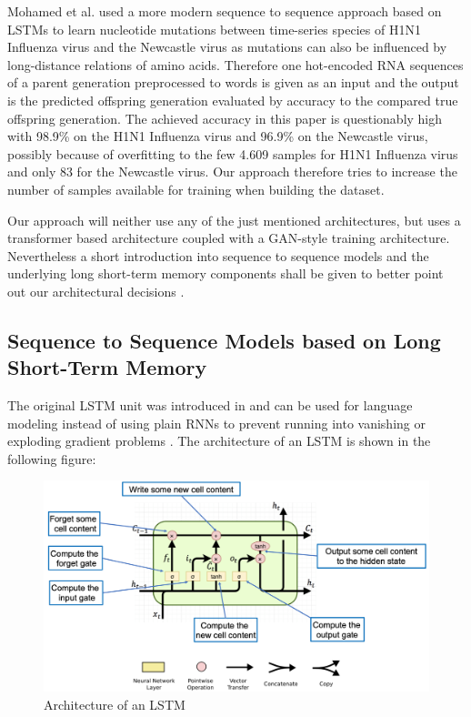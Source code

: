 Mohamed et al. \cite{Mohamed2021} used a more modern sequence to sequence approach based on \acp{LSTM} to learn nucleotide mutations between time-series species of H1N1 Influenza virus and the Newcastle virus as mutations can also be influenced by long-distance relations of amino acids. Therefore one hot-encoded \ac{RNA} sequences of a parent generation preprocessed to words is given as an input and the output is the predicted offspring generation evaluated by accuracy to the compared true offspring generation. The achieved accuracy in this paper is questionably high with 98.9\% on the H1N1 Influenza virus and 96.9\% on the Newcastle virus, possibly because of overfitting to the few 4.609 samples for H1N1 Influenza virus and only 83 for the Newcastle virus. Our approach therefore tries to increase the number of samples available for training when building the dataset. 

Our approach will neither use any of the just mentioned architectures, but uses a transformer based architecture coupled with a GAN-style training architecture. Nevertheless a short introduction into sequence to sequence models and the underlying long short-term memory components shall be given to better point out our architectural decisions . 

\subsection{Sequence to Sequence Models based on Long Short-Term Memory} \label{fundamentalsE}


The original \ac{LSTM} unit was introduced in \cite{Hochreiter1997} and can be used for language modeling instead of using plain \acp{RNN} to prevent running into vanishing or exploding gradient problems \cite{Sundermeyer2012}. The architecture of an \ac{LSTM} is shown in the following figure:

\begin{figure}[ht]
	\centering
	\includegraphics[width=\linewidth]{figures/lstm_architecture.png}
	\caption{Architecture of an \ac{LSTM} \cite{Gertz2020}}
	\label{lstm_architecture}
\end{figure}

